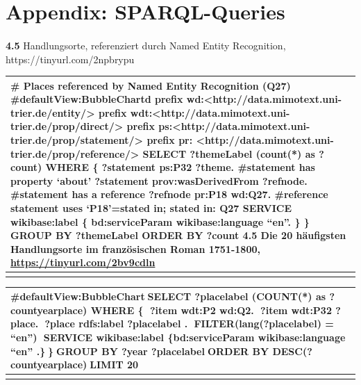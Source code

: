 \documentclass[
  12pt,
  letterpaper,
  DIV=11,
  numbers=noendperiod]{scrreprt}
\makeatletter
\let\oldparagraph\paragraph
\renewcommand{\paragraph}{
    \@ifstar
      \xxxParagraphStar
      \xxxParagraphNoStar
  }
\newcommand{\xxxParagraphStar}[1]{\oldparagraph*{#1}\mbox{}}
\newcommand{\xxxParagraphNoStar}[1]{\oldparagraph{#1}\mbox{}}
\makeatother
\begin{document}
\section{}\label{section-6}

\section{Appendix: SPARQL-Queries}\label{appendix-sparql-queries-1}

\paragraph{\texorpdfstring{\textbf{4.5} Handlungsorte, referenziert
durch Named Entity Recognition,
https://tinyurl.com/2npbrypu}{4.5 Handlungsorte, referenziert durch Named Entity Recognition, https://tinyurl.com/2npbrypu}}\label{handlungsorte-referenziert-durch-named-entity-recognition-httpstinyurl.com2npbrypu}

\begin{longtable}[]{@{}
  >{\raggedright\arraybackslash}p{}@{}}
\toprule\noalign{}
\begin{minipage}[b]{\linewidth}\raggedright
\# Places referenced by Named Entity Recognition (Q27)
\#defaultView:BubbleChartd prefix
wd:\textless http://data.mimotext.uni-trier.de/entity/\textgreater{}
prefix
wdt:\textless http://data.mimotext.uni-trier.de/prop/direct/\textgreater{}
prefix
ps:\textless http://data.mimotext.uni-trier.de/prop/statement/\textgreater{}
prefix pr:
\textless http://data.mimotext.uni-trier.de/prop/reference/\textgreater{}
SELECT ?themeLabel (count(*) as ?count) WHERE \{ ?statement ps:P32
?theme. \#statement has property `about' ?statement prov:wasDerivedFrom
?refnode. \#statement has a reference ?refnode pr:P18 wd:Q27.
\#reference statement uses `P18'=stated in; stated in: Q27 SERVICE
wikibase:label \{ bd:serviceParam wikibase:language ``en''. \} \} GROUP
BY ?themeLabel ORDER BY ?count 4.5 Die 20 häufigsten Handlungsorte im
französischen Roman 1751-1800, \url{https://tinyurl.com/2bv9cdln}
\end{minipage} \\
\midrule\noalign{}
\endhead
\bottomrule\noalign{}
\endlastfoot
\end{longtable}

\begin{longtable}[]{@{}
  >{\raggedright\arraybackslash}p{}@{}}
\toprule\noalign{}
\begin{minipage}[b]{\linewidth}\raggedright
\#defaultView:BubbleChartSELECT ?placelabel (COUNT(*) as
?countyearplace) WHERE \{ ?item wdt:P2 wd:Q2. ?item wdt:P32 ?place.
?place rdfs:label ?placelabel . FILTER(lang(?placelabel) = ``en'')
SERVICE wikibase:label \{bd:serviceParam wikibase:language ``en''
.\}\}GROUP BY ?year ?placelabelORDER BY DESC(?countyearplace)LIMIT 20
\end{minipage} \\
\midrule\noalign{}
\endhead
\bottomrule\noalign{}
\endlastfoot
\end{longtable}
\end{document}
